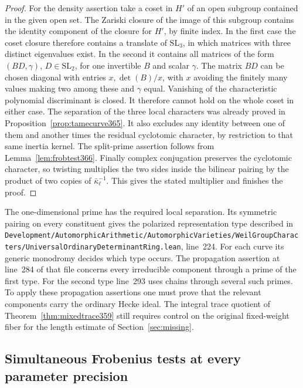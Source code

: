 \documentclass[a4paper,11pt]{article}
\theoremstyle{definition}
\theoremstyle{remark}
\newcommand{\srcloc}[2]{{\small\nolinkurl{#1.lean}}, line~#2}
\numberwithin{equation}{section}
\begin{document}
\begin{proof}
For the density assertion take a coset in \(H'\) of an open
subgroup contained in the given open set. The Zariski
closure of the image of this subgroup contains the identity
component of the closure for \(H'\), by finite index.
In the first case the coset closure therefore contains a
translate of \(\mathrm{SL}_3\), in which matrices with three
distinct eigenvalues exist. In the second it contains all
matrices of the form \((BD,\gamma)\), \(D\in\mathrm{SL}_2\),
for one invertible \(B\) and scalar \(\gamma\).
The matrix \(BD\) can be chosen diagonal with entries
\(x,\det(B)/x\), with \(x\) avoiding the finitely many values
making two among these and \(\gamma\) equal. Vanishing of the
characteristic polynomial discriminant is closed. It therefore
cannot hold on the whole coset in either case. The separation
of the three local characters was already proved in
Proposition~\ref{prop:tamecurve365}. It also excludes any
identity between one of them and another times the residual
cyclotomic character, by restriction to that same inertia
kernel. The split-prime assertion follows from
Lemma~\ref{lem:frobtest366}. Finally complex conjugation
preserves the cyclotomic character, so twisting multiplies
the two sides inside the bilinear pairing by the product of
two copies of \(\bar\kappa_\ell^{-1}\). This gives the stated
multiplier and finishes the proof.
\end{proof}

The one-dimensional prime has the required local separation.
Its symmetric pairing on every constituent gives the
polarized representation type described in
\srcloc{Development/AutomorphicArithmetic/AutomorphicVarieties/WeilGroupCharacters/UniversalOrdinaryDeterminantRing}{224}.
For each curve its generic monodromy decides which type occurs.
The propagation assertion at line~284 of that file concerns
every irreducible component through a prime of the first
type. For the second type line~293 uses chains through several
such primes. To apply these propagation assertions one must
prove that the relevant components carry the ordinary Hecke
ideal. The integral trace quotient of
Theorem~\ref{thm:mixedtrace359} still requires control on the
original fixed-weight fiber for the length estimate of
Section~\ref{sec:missing}.


\subsection{Simultaneous Frobenius tests at every parameter precision}
\label{sec:pairedtests367}
\end{document}
